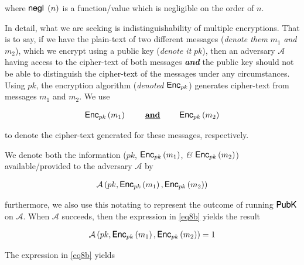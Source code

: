 \documentclass[../CryptoFinal.tex]{subfiles}
\begin{document}
\begin{flushleft}
where $\text{{\fontfamily{phv}\selectfont negl }} \left( n \right)$ is a function/value which is negligible on the order of $n$.  \newline

In detail, what we are seeking is indistinguishability of multiple encryptions.  That is to say, if we have the plain-text of two different messages (\emph{denote them} $m_1$ \emph{and} $m_2$), which we encrypt using a public key (\emph{denote it} $pk$), then an adversary $\mathcal{A}$ having access to the cipher-text of both messages \textbf{\emph{and}} the public key should not be able to distinguish the cipher-text of the messages  under any circumstances.  Using $pk$, the encryption algorithm (\emph{denoted} $\text{{\fontfamily{phv}\selectfont Enc}}_{pk}$) generates cipher-text from messages $m_1$ and $m_2$.  We use

\begin{align*}
  \text{{\fontfamily{phv}\selectfont Enc}}_{pk} \left( m_1 \right) \qquad \text{ \textbf{\underline{and}} } \qquad \text{{\fontfamily{phv}\selectfont Enc}}_{pk} \left( m_2 \right)
\end{align*}

to denote the cipher-text generated for these messages, respectively.  \newline


We denote both the information ($pk$,  $\text{{\fontfamily{phv}\selectfont Enc}}_{pk} \left( m_1 \right)$, \emph{\&} $\text{{\fontfamily{phv}\selectfont Enc}}_{pk} \left( m_2 \right)$) available/provided to the adversary $\mathcal{A}$ by

\begin{align}
  \mathcal{A} \left( pk,  \text{{\fontfamily{phv}\selectfont Enc}}_{pk} \left( m_1 \right), \text{{\fontfamily{phv}\selectfont Enc}}_{pk} \left( m_2 \right) \right) \label{eq8b}
\end{align}

furthermore, we also use this notating to represent the outcome of running $\text{{\fontfamily{phv}\selectfont PubK}}$ on $\mathcal{A}$.  When $\mathcal{A}$ succeeds, then the expression in \ref{eq8b} yields the result 

\begin{align}
  \mathcal{A} \left( pk,  \text{{\fontfamily{phv}\selectfont Enc}}_{pk} \left( m_1 \right), \text{{\fontfamily{phv}\selectfont Enc}}_{pk} \left( m_2 \right) \right) = 1 \label{eq8aaA}
\end{align}

The expression in \ref{eq8b} yields


\end{flushleft}
\end{document}

